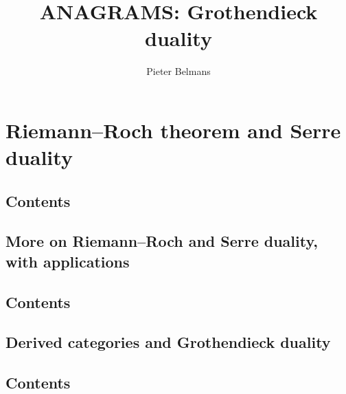\documentclass[oneside,openany,a4paper]{memoir}
\title{ANAGRAMS: Grothendieck duality}
\author{Pieter Belmans}
\begin{document}
\setcounter{tocdepth}{1}
\setcounter{secnumdepth}{2}
\tableofcontents*

\chapter{Riemann--Roch theorem and Serre duality}
\begin{refsection}
  

  \startcontents[chapters]
  \section*{Contents}
  \clearpage

  
  \clearpage
  
  \printbibliography[heading=subbibliography]
\end{refsection}


\begin{refsection}
  \chapter{More on Riemann--Roch and Serre duality, with applications}

  

  \startcontents[chapters]
  \section*{Contents}
  \clearpage

  
  \clearpage

  \printbibliography[heading=subbibliography]
\end{refsection}


\begin{refsection}
  \chapter{Derived categories and Grothendieck duality}

  

  \startcontents[chapters]
  \section*{Contents}
  \clearpage

  
  \clearpage

  \printbibliography[heading=subbibliography]
\end{refsection}
\end{document}
